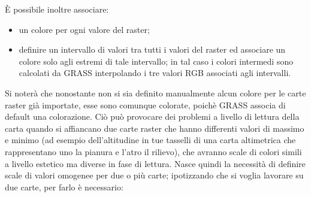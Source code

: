 	È possibile inoltre associare:
	
	\begin{itemize}
		\item un colore per ogni valore del raster;
		\item definire un intervallo di valori tra tutti i valori del raster ed associare un colore solo agli estremi di tale intervallo; in tal caso i colori intermedi sono calcolati da GRASS interpolando i tre valori RGB associati agli intervalli.
	\end{itemize}
	
	Si noterà che nonostante non si sia definito manualmente alcun colore per le carte raster già importate, esse sono comunque colorate, poichè GRASS associa di default una colorazione. Ciò può provocare dei problemi a livello di lettura della carta quando si affiancano due carte raster che hanno differenti valori di massimo e minimo (ad esempio dell'altitudine in tue tasselli di una carta altimetrica che rappresentano uno la pianura e l'atro il rilievo), che avranno scale di colori simili a livello estetico ma diverse in fase di lettura. Nasce quindi la necessità di definire scale di valori omogenee per due o più carte; ipotizzando che si voglia lavorare su due carte, per farlo è necessario:
	
